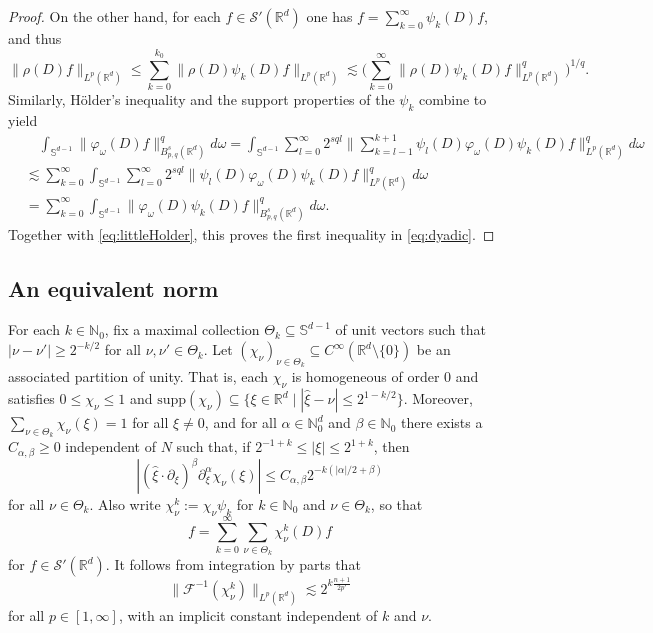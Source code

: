 \documentclass{amsart}
\theoremstyle{definition}
\newcommand{\N}{\mathbb{N}}
\newcommand {\Rd}{\mathbb{R}^{d}}
\newcommand {\w}{\omega}
\newcommand {\ph}{\varphi}
\newcommand{\Su}{\mathbb{S}}
\newcommand {\supp}{\mathrm{supp}}
\newcommand {\Sw}{\mathcal{S}}
\newcommand {\F}{{\mathcal{F}}}
\numberwithin{equation}{section}
\begin{document}
\begin{proof}
On the other hand, for each $f\in\Sw'(\Rd)$ one has $f=\sum_{k=0}^{\infty}\psi_{k}(D)f$, and thus
\[
\|\rho(D)f\|_{L^{p}(\Rd)}\leq \sum_{k=0}^{k_{0}}\|\rho(D)\psi_{k}(D)f\|_{L^{p}(\Rd)}\lesssim \Big(\sum_{k=0}^{\infty}\|\rho(D)\psi_{k}(D)f\|_{L^{p}(\Rd)}^{q}\Big)^{1/q}.
\]
Similarly, H\"{o}lder's inequality and the support properties of the $\psi_{k}$ combine to yield
\begin{align*}
&\quad\int_{\mathbb{S}^{d-1}}\|\ph_{\w}(D)f\|_{B^{s}_{p,q}(\Rd)}^{q}d\w=\int_{\mathbb{S}^{d-1}}\sum_{l=0}^{\infty}2^{sql}\Big\|\sum_{k=l-1}^{k+1}\psi_{l}(D)\ph_{\w}(D)\psi_{k}(D)f\Big\|_{L^{p}(\Rd)}^{q}d\w\\
&\lesssim \sum_{k=0}^{\infty}\int_{\mathbb{S}^{d-1}}\sum_{l=0}^{\infty}2^{sql}\|\psi_{l}(D)\ph_{\w}(D)\psi_{k}(D)f\|_{L^{p}(\Rd)}^{q}d\w\\
&=\sum_{k=0}^{\infty}\int_{\mathbb{S}^{d-1}}\|\ph_{\w}(D)\psi_{k}(D)f\|_{B^{s}_{p,q}(\Rd)}^{q}d\w.
\end{align*}
Together with \eqref{eq:littleHolder}, this proves the first inequality in \eqref{eq:dyadic}.
\end{proof}

\subsection{An equivalent norm}\label{subsec:norm}


For each $k\in \N_{0}$, fix a maximal collection $\Theta_{k}\subseteq \Su^{d-1}$ of unit vectors such that $|\nu-\nu'|\geq 2^{-k/2}$ for all $\nu,\nu'\in \Theta_{k}$. Let $(\chi_{\nu})_{\nu\in\Theta_{k}}\subseteq C^{\infty}(\Rd\setminus\{0\})$ be an associated partition of unity. That is, each $\chi_{\nu}$ is homogeneous of order $0$ and satisfies $0\leq \chi_{\nu}\leq 1$ and $\supp(\chi_{\nu})\subseteq\{\xi\in\Rd\mid |\hat{\xi}-\nu|\leq 2^{1-k/2}\}$. Moreover, $\sum_{\nu\in \Theta_{k}}\chi_{\nu}(\xi)=1$ for all $\xi\neq0$, and for all $\alpha\in\N_{0}^{d}$ and $\beta\in\N_{0}$ there exists a $C_{\alpha,\beta}\geq0$ independent of $N$ such that, if $2^{-1+k}\leq |\xi|\leq 2^{1+k}$, then
\[
|(\hat{\xi}\cdot\partial_{\xi})^{\beta}\partial_{\xi}^{\alpha}\chi_{\nu}(\xi)|\leq C_{\alpha,\beta}2^{-k(|\alpha|/2+\beta)}
\]
for all $\nu\in \Theta_{k}$. Also write $\chi_{\nu}^{k}:=\chi_{\nu}\psi_{k}$ for $k\in\N_{0}$ and $\nu\in\Theta_{k}$, so that 
\begin{equation}\label{eq:decompose}
f=\sum_{k=0}^{\infty}\sum_{\nu\in\Theta_{k}}\chi_{\nu}^{k}(D)f
\end{equation}
for $f\in\Sw'(\Rd)$. It follows from integration by parts that
\begin{equation}\label{eq:kernelbounds}
\|\F^{-1}(\chi_{\nu}^{k})\|_{L^{p}(\Rd)}\lesssim 2^{k\frac{n+1}{2p'}}
\end{equation}
for all $p\in[1,\infty]$, with an implicit constant independent of $k$ and $\nu$.
\end{document}

